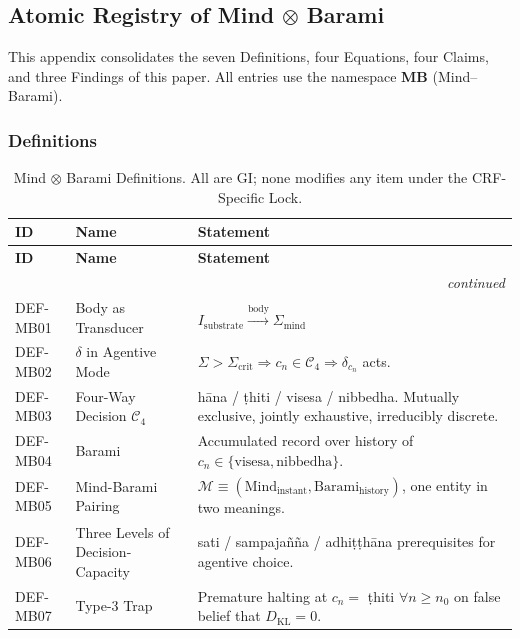 \documentclass[12pt, a4paper]{article}
\begin{document}
\newpage

\appendix
\subsection{Atomic Registry of Mind $\otimes$ Barami}

This appendix consolidates the seven Definitions, four Equations,
four Claims, and three Findings of this paper. All entries use the
namespace \textbf{MB} (Mind--Barami).

\subsubsection{Definitions}

{\small
\renewcommand{\arraystretch}{1.30}
\begin{longtable}{@{}p{1.7cm} p{4.5cm} p{6.5cm}@{}}
\caption{Mind $\otimes$ Barami Definitions. All are GI; none modifies any
item under the CRF-Specific Lock.}\\
\toprule
\textbf{ID} & \textbf{Name} & \textbf{Statement} \\
\midrule
\endfirsthead
\toprule
\textbf{ID} & \textbf{Name} & \textbf{Statement} \\
\midrule
\endhead
\midrule \multicolumn{3}{r}{\emph{continued}}\\ \endfoot
\bottomrule \endlastfoot
DEF-MB01 & Body as Transducer & $I_{\mathrm{substrate}} \xrightarrow{\text{body}} \Sigma_{\mathrm{mind}}$ \\
DEF-MB02 & $\delta$ in Agentive Mode & $\Sigma > \Sigma_{\mathrm{crit}} \Rightarrow c_n \in \mathcal{C}_4 \Rightarrow \delta_{c_n}$ acts. \\
DEF-MB03 & Four-Way Decision $\mathcal{C}_4$ & hāna / ṭhiti / visesa / nibbedha. Mutually exclusive, jointly exhaustive, irreducibly discrete. \\
DEF-MB04 & Barami & Accumulated record over history of $c_n \in \{\text{visesa}, \text{nibbedha}\}$. \\
DEF-MB05 & Mind-Barami Pairing & $\mathcal{M} \equiv (\mathrm{Mind}_{\mathrm{instant}}, \mathrm{Barami}_{\mathrm{history}})$, one entity in two meanings. \\
DEF-MB06 & Three Levels of Decision-Capacity & sati / sampajañña / adhiṭṭhāna prerequisites for agentive choice. \\
DEF-MB07 & Type-3 Trap & Premature halting at $c_n = $ ṭhiti $\forall n \ge n_0$ on false belief that $D_{\mathrm{KL}} = 0$. \\
\end{longtable}
}
\end{document}
